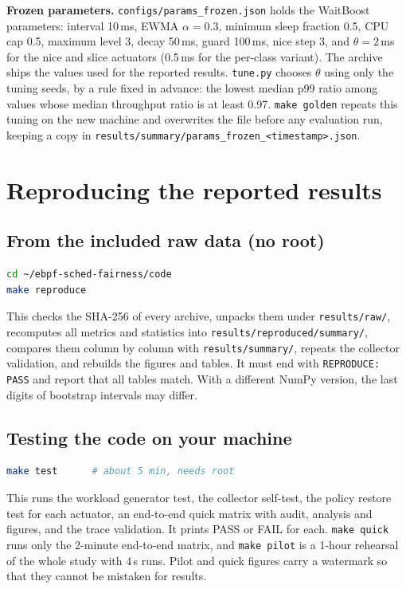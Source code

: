 \documentclass[10.5pt,a4paper]{article}
\newcommand{\f}[1]{\texttt{#1}}
\begin{document}
\textbf{Frozen parameters.} \f{configs/params\_frozen.json} holds the WaitBoost parameters: interval 10\,ms, EWMA $\alpha=0.3$, minimum sleep fraction 0.5, CPU cap 0.5, maximum level 3, decay 50\,ms, guard 100\,ms, nice step 3, and $\theta=2$\,ms for the nice and slice actuators (0.5\,ms for the per-class variant). The archive ships the values used for the reported results. \f{tune.py} chooses $\theta$ using only the tuning seeds, by a rule fixed in advance: the lowest median p99 ratio among values whose median throughput ratio is at least 0.97. \f{make golden} repeats this tuning on the new machine and overwrites the file before any evaluation run, keeping a copy in \f{results/summary/params\_frozen\_<timestamp>.json}.

\section{Reproducing the reported results}

\subsection{From the included raw data (no root)}\label{sec:from-raw}
\begin{lstlisting}[language=bash]
cd ~/ebpf-sched-fairness/code
make reproduce
\end{lstlisting}
This checks the SHA-256 of every archive, unpacks them under \f{results/raw/}, recomputes all metrics and statistics into \f{results/reproduced/summary/}, compares them column by column with \f{results/summary/}, repeats the collector validation, and rebuilds the figures and tables. It must end with \f{REPRODUCE: PASS} and report that all tables match. With a different NumPy version, the last digits of bootstrap intervals may differ.

\subsection{Testing the code on your machine}\label{sec:tests}
\begin{lstlisting}[language=bash]
make test      # about 5 min, needs root
\end{lstlisting}
This runs the workload generator test, the collector self-test, the policy restore test for each actuator, an end-to-end quick matrix with audit, analysis and figures, and the trace validation. It prints PASS or FAIL for each. \f{make quick} runs only the 2-minute end-to-end matrix, and \f{make pilot} is a 1-hour rehearsal of the whole study with 4\,s runs. Pilot and quick figures carry a watermark so that they cannot be mistaken for results.
\end{document}
